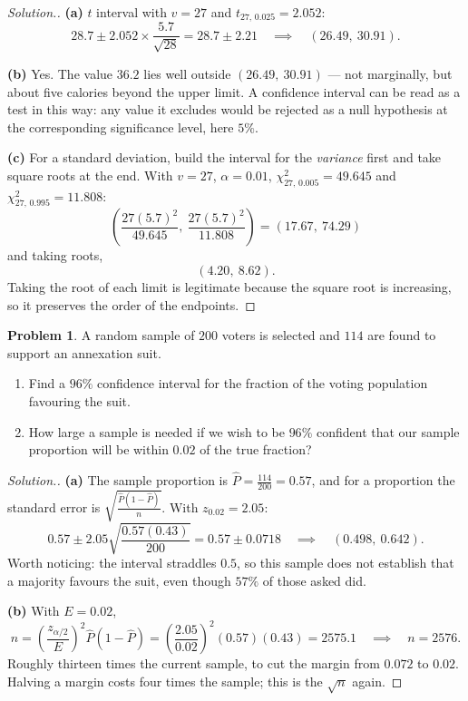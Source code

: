 \documentclass[11pt,a4paper]{article}
\theoremstyle{definition}
\newtheorem{problemx}{Problem}[section]
\newenvironment{problem}{\begin{problemx}}{\end{problemx}}
\newenvironment{solution}
  {\renewcommand{\qedsymbol}{}\begin{proof}[\textit{Solution}.]}
  {\end{proof}}
\begin{document}
\begin{solution}
\textbf{(a)} $t$ interval with $v=27$ and $t_{27,\,0.025}=2.052$:
\[28.7\pm 2.052\times\frac{5.7}{\sqrt{28}}=28.7\pm 2.21
\quad\implies\quad (26.49,\ 30.91).\]

\textbf{(b)} Yes. The value $36.2$ lies well outside $(26.49,\ 30.91)$ --- not marginally,
but about five calories beyond the upper limit. A confidence interval can be read as a test
in this way: any value it excludes would be rejected as a null hypothesis at the
corresponding significance level, here $5\%$.

\textbf{(c)} For a standard deviation, build the interval for the \emph{variance} first and
take square roots at the end. With $v=27$, $\alpha=0.01$, $\chi^2_{27,\,0.005}=49.645$ and
$\chi^2_{27,\,0.995}=11.808$:
\[\left(\frac{27(5.7)^2}{49.645},\ \frac{27(5.7)^2}{11.808}\right)=(17.67,\ 74.29)\]
and taking roots,
\[(4.20,\ 8.62).\]
Taking the root of each limit is legitimate because the square root is increasing, so it
preserves the order of the endpoints.
\end{solution}

\begin{problem}
A random sample of $200$ voters is selected and $114$ are found to support an annexation
suit.
\begin{enumerate}
\item[(a).] Find a $96\%$ confidence interval for the fraction of the voting population
favouring the suit.
\item[(b).] How large a sample is needed if we wish to be $96\%$ confident that our sample
proportion will be within $0.02$ of the true fraction?
\end{enumerate}
\end{problem}

\begin{solution}
\textbf{(a)} The sample proportion is $\hat{P}=\frac{114}{200}=0.57$, and for a proportion
the standard error is $\sqrt{\frac{\hat{P}(1-\hat{P})}{n}}$. With $z_{0.02}=2.05$:
\[0.57\pm 2.05\sqrt{\frac{0.57(0.43)}{200}}=0.57\pm 0.0718
\quad\implies\quad (0.498,\ 0.642).\]
Worth noticing: the interval straddles $0.5$, so this sample does not establish that a
majority favours the suit, even though $57\%$ of those asked did.

\textbf{(b)} With $E=0.02$,
\[n=\left(\frac{z_{\alpha/2}}{E}\right)^2\hat{P}(1-\hat{P})
=\left(\frac{2.05}{0.02}\right)^2(0.57)(0.43)=2575.1\quad\implies\quad n=2576.\]
Roughly thirteen times the current sample, to cut the margin from $0.072$ to $0.02$. Halving
a margin costs four times the sample; this is the $\sqrt{n}$ again.
\end{solution}
\end{document}
